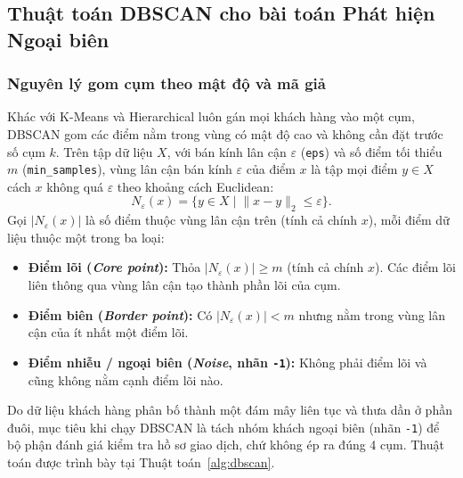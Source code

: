 \documentclass[12pt,a4paper]{article}
\numberwithin{equation}{section}
\numberwithin{table}{section}
\numberwithin{figure}{section}
\begin{document}
\subsection{Thuật toán DBSCAN cho bài toán Phát hiện Ngoại biên}

\subsubsection{Nguyên lý gom cụm theo mật độ và mã giả}

Khác với K-Means và Hierarchical luôn gán mọi khách hàng vào một cụm, DBSCAN gom các điểm nằm trong vùng có mật độ cao và không cần đặt trước số cụm $k$. Trên tập dữ liệu $X$, với bán kính lân cận $\varepsilon$ (\texttt{eps}) và số điểm tối thiểu $m$ (\texttt{min\_samples}), vùng lân cận bán kính $\varepsilon$ của điểm $x$ là tập mọi điểm $y \in X$ cách $x$ không quá $\varepsilon$ theo khoảng cách Euclidean:
\begin{equation}
    N_\varepsilon(x) = \{ y \in X \mid \lVert x - y \rVert_2 \le \varepsilon \}.
    \label{eq:eps_neighborhood}
\end{equation}
Gọi $|N_\varepsilon(x)|$ là số điểm thuộc vùng lân cận trên (tính cả chính $x$), mỗi điểm dữ liệu thuộc một trong ba loại:
\begin{itemize}[leftmargin=1.5em]
    \item \textbf{Điểm lõi (\emph{Core point}):} Thỏa $|N_\varepsilon(x)| \ge m$ (tính cả chính $x$). Các điểm lõi liên thông qua vùng lân cận tạo thành phần lõi của cụm.
    \item \textbf{Điểm biên (\emph{Border point}):} Có $|N_\varepsilon(x)| < m$ nhưng nằm trong vùng lân cận của ít nhất một điểm lõi.
    \item \textbf{Điểm nhiễu / ngoại biên (\emph{Noise}, nhãn \texttt{-1}):} Không phải điểm lõi và cũng không nằm cạnh điểm lõi nào.
\end{itemize}

Do dữ liệu khách hàng phân bố thành một đám mây liên tục và thưa dần ở phần đuôi, mục tiêu khi chạy DBSCAN là tách nhóm khách ngoại biên (nhãn \texttt{-1}) để bộ phận đánh giá kiểm tra hồ sơ giao dịch, chứ không ép ra đúng 4 cụm. Thuật toán được trình bày tại Thuật toán~\ref{alg:dbscan}.
\end{document}
